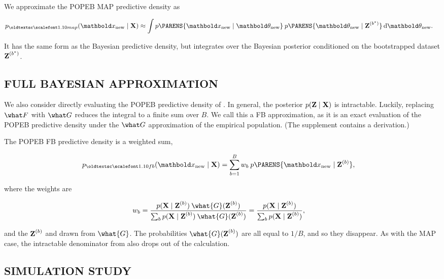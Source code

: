 We approximate the \gls{POPEB} \gls{MAP} predictive density as\hspace*{-10pt}
\begin{linenomath}
\begin{align}
  p_{\textsc{map}}(\xnew\mid\mbX)
  &\approx
  \int
  p\PARENS{\xnew \mid \thetanew}
  \:
  p\PARENS{\thetanew \mid \mbZ^{(b^*)}}
  \dif\thetanew.
  \label{eq:popeb_map_predictive}
\end{align}
\end{linenomath}
It has the same form as the Bayesian predictive density, but integrates over
the Bayesian posterior conditioned on the bootstrapped dataset $\textbf{Z}^{(b^*)}$.

\subsection{FULL BAYESIAN APPROXIMATION}
\label{sub:weighted}

We also consider directly evaluating the \gls{POPEB} predictive density of
. In general, the posterior $p(\textbf{Z}\mid\textbf{X})$ is
intractable. Luckily, replacing $\what F$ with $\what G$ reduces the
integral to a finite sum over $B$. We call this a \gls{FB} approximation, as
it is an exact evaluation of the \gls{POPEB} predictive density under the
$\what G$ approximation of the empirical population. (The supplement
contains a derivation.)

The \gls{POPEB} \gls{FB} predictive density is a weighted sum,
\begin{linenomath}
\begin{align*}
  p_{\textsc{fb}}(\xnew\mid\mbX)
  &=
  \sum_{b=1}^{B} w_b \: p\PARENS{\xnew \mid \mbZ^{(b)}},
\end{align*}
\end{linenomath}
where the weights are
\begin{linenomath}
\begin{align*}
  w_b
  &=
  \frac{p(\mbX\mid\mbZ^{(b)})\:\what{G}(\mbZ^{(b)})}
  {\sum_b p(\mbX\mid\mbZ^{(b)})\:\what{G}(\mbZ^{(b)})}
  = \frac{p(\mbX\mid \mbZ^{(b)})}{\sum_b p(\mbX\mid \mbZ^{(b)})},
\end{align*}
\end{linenomath}
and the $\textbf{Z}^{(b)}$ and drawn from $\what{G}$. The probabilities
$\what{G}(\mbZ^{(b)})$ are all equal to $1/B$, and so they disappear. As with
the \gls{MAP} case, the intractable denominator from 
also drops out of the calculation.


\subsection{SIMULATION STUDY}
\label{sub:simulation}

